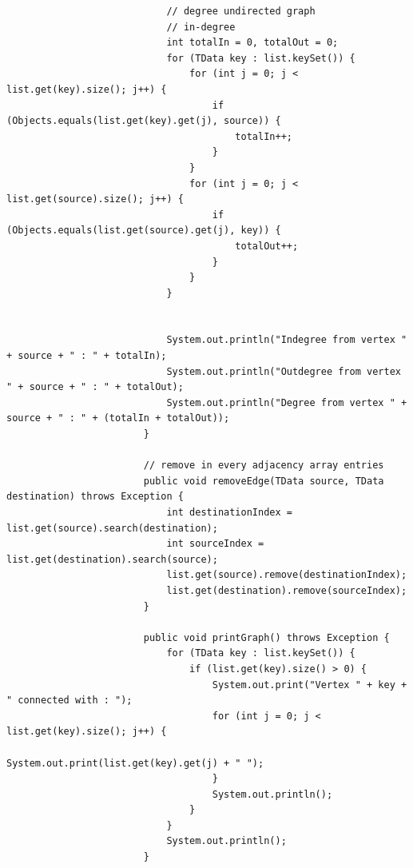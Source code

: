 \documentclass[12pt,titlepage]{article}
\begin{document}
\begin{enumerate}
{\begin{itemize}
{\begin{verbatim}
                            // degree undirected graph
                            // in-degree
                            int totalIn = 0, totalOut = 0;
                            for (TData key : list.keySet()) {
                                for (int j = 0; j < list.get(key).size(); j++) {
                                    if (Objects.equals(list.get(key).get(j), source)) {
                                        totalIn++;
                                    }
                                }
                                for (int j = 0; j < list.get(source).size(); j++) {
                                    if (Objects.equals(list.get(source).get(j), key)) {
                                        totalOut++;
                                    }
                                }
                            }


                            System.out.println("Indegree from vertex " + source + " : " + totalIn);
                            System.out.println("Outdegree from vertex " + source + " : " + totalOut);
                            System.out.println("Degree from vertex " + source + " : " + (totalIn + totalOut));
                        }

                        // remove in every adjacency array entries
                        public void removeEdge(TData source, TData destination) throws Exception {
                            int destinationIndex = list.get(source).search(destination);
                            int sourceIndex = list.get(destination).search(source);
                            list.get(source).remove(destinationIndex);
                            list.get(destination).remove(sourceIndex);
                        }

                        public void printGraph() throws Exception {
                            for (TData key : list.keySet()) {
                                if (list.get(key).size() > 0) {
                                    System.out.print("Vertex " + key + " connected with : ");
                                    for (int j = 0; j < list.get(key).size(); j++) {
                                        System.out.print(list.get(key).get(j) + " ");
                                    }
                                    System.out.println();
                                }
                            }
                            System.out.println();
                        }


\end{verbatim}}
\end{itemize}}
\end{enumerate}
\end{document}
